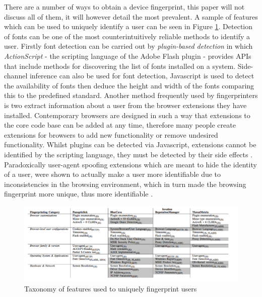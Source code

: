 \documentclass{article}
\begin{document}
There are a number of ways to obtain a device fingerprint, this paper will not discuss all of them, it will however detail the most prevalent. A sample of features which can be used to uniquely identify a user can be seen in Figure \ref{fig:fingerprintingConfigs}. Detection of fonts can be one of the most counterintuitively reliable methods to identify a user. Firstly font detection can be carried out by \textit{plugin-based detection} in which \textit{ActionScript} - the scripting language of the Adobe Flash plugin - provides APIs that include methods for discovering the list of fonts installed on a system. Side-channel inference can also be used for font detection, Javascript is used to detect the availability of fonts then deduce the height and width of the fonts comparing this to the predefined standard. Another method frequently used by fingerprinters is two extract information about a user from the browser extensions they have installed. Contemporary browsers are designed in such a way that extensions to the core code base can be added at any time, therefore many people create extensions for browsers to add new functionality or remove undesired functionality. Whilst plugins can be detected via Javascript, extensions cannot be identified by the scripting language, they must be detected by their side effects \parencite{dustingFP}. Paradoxically user-agent spoofing extensions which are meant to hide the identity of a user, were shown to actually make a user more identifiable due to inconsistencies in the browsing environment, which in turn made the browsing fingerprint more unique, thus more identifiable  \parencite{cookielessMonster}. 

\begin{figure}[H]
    \centering
    \includegraphics[width=1\textwidth]{fingerprintingConfigs}
    \caption{Taxonomy of features used to uniquely fingerprint users \parencite{cookielessMonster}}
    \label{fig:fingerprintingConfigs}
\end{figure}
\end{document}
